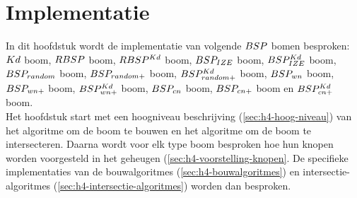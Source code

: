 \chapter{Implementatie}
\label{hoofdstuk:implementatie}
In dit hoofdstuk wordt de implementatie van volgende $BSP$ bomen besproken: $Kd$ boom, $RBSP$ boom, $RBSP^{Kd}$ boom, $BSP_{IZE}$ boom, $BSP^{Kd}_{IZE}$ boom, $BSP_{random}$ boom, $BSP_{random+}$ boom, $BSP^{Kd}_{random+}$ boom, $BSP_{wn}$ boom, $BSP_{wn+}$ boom, $BSP^{Kd}_{wn+}$ boom, $BSP_{cn}$ boom, $BSP_{cn+}$ boom en $BSP^{Kd}_{cn+}$ boom. \\

Het hoofdstuk start met een hoogniveau beschrijving (\ref{sec:h4-hoog-niveau}) van het algoritme om de boom te bouwen en het algoritme om de boom te intersecteren.
Daarna wordt voor elk type boom besproken hoe hun knopen worden voorgesteld in het geheugen (\ref{sec:h4-voorstelling-knopen}.
De specifieke implementaties van de bouwalgoritmes (\ref{sec:h4-bouwalgoritmes}) en intersectie-algoritmes (\ref{sec:h4-intersectie-algoritmes}) worden dan besproken.



\lstset{style=pseudoStyle}

